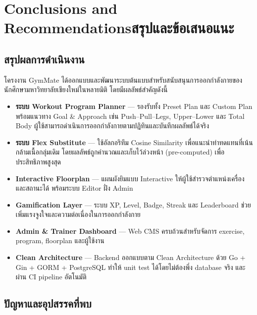\chapter{\ifenglish Conclusions and Recommendations\else สรุปและข้อเสนอแนะ\fi}
\label{chap:conclusion}

\section{สรุปผลการดำเนินงาน}
\label{sec:summary}

\noindent
โครงงาน GymMate ได้ออกแบบและพัฒนาระบบต้นแบบสำหรับสนับสนุนการออกกำลังกายของนักศึกษามหาวิทยาลัยเชียงใหม่ในหลายมิติ โดยมีผลลัพธ์สำคัญดังนี้

\begin{itemize}
  \item \textbf{ระบบ Workout Program Planner} — รองรับทั้ง Preset Plan และ Custom Plan พร้อมแนวทาง Goal \& Approach เช่น Push–Pull–Legs, Upper–Lower และ Total Body ผู้ใช้สามารถดำเนินการออกกำลังกายตามปฏิทินและบันทึกผลลัพธ์ได้จริง
  \item \textbf{ระบบ Flex Substitute} — ใช้อัลกอริทึม Cosine Similarity เพื่อแนะนำท่าทดแทนที่เน้นกล้ามเนื้อกลุ่มเดิม โดยผลลัพธ์ถูกคำนวณและเก็บไว้ล่วงหน้า (pre-computed) เพื่อประสิทธิภาพสูงสุด
  \item \textbf{Interactive Floorplan} — แผนผังยิมแบบ Interactive ให้ผู้ใช้สำรวจตำแหน่งเครื่องและสถานะได้ พร้อมระบบ Editor ฝั่ง Admin
  \item \textbf{Gamification Layer} — ระบบ XP, Level, Badge, Streak และ Leaderboard ช่วยเพิ่มแรงจูงใจและความต่อเนื่องในการออกกำลังกาย
  \item \textbf{Admin \& Trainer Dashboard} — Web CMS ครบถ้วนสำหรับจัดการ exercise, program, floorplan และผู้ใช้งาน
  \item \textbf{Clean Architecture} — Backend ออกแบบตาม Clean Architecture ด้วย Go + Gin + GORM + PostgreSQL ทำให้ unit test ได้โดยไม่ต้องพึ่ง database จริง และผ่าน CI pipeline อัตโนมัติ
\end{itemize}

\section{ปัญหาและอุปสรรคที่พบ}
\label{sec:problems}

